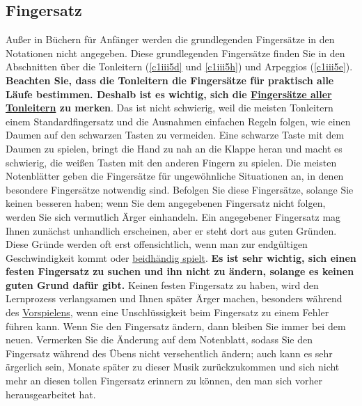 
\subsection{Fingersatz}
\label{c1ii18}

Außer in Büchern für Anfänger werden die grundlegenden Fingersätze in den Notationen nicht angegeben.
Diese grundlegenden Fingersätze finden Sie in den Abschnitten über die Tonleitern (\hyperref[c1iii5d]{\autoref{c1iii5d}} und \hyperref[c1iii5h]{\autoref{c1iii5h}}) und Arpeggios (\hyperref[c1iii5e]{\autoref{c1iii5e}}).
\textbf{Beachten Sie, dass die Tonleitern die Fingersätze für praktisch alle Läufe bestimmen.
Deshalb ist es wichtig, sich die \hyperref[table]{Fingersätze aller Tonleitern} zu merken}.
Das ist nicht schwierig, weil die meisten Tonleitern einem Standardfingersatz und die Ausnahmen einfachen Regeln folgen, wie einen Daumen auf den schwarzen Tasten zu vermeiden.
Eine schwarze Taste mit dem Daumen zu spielen, bringt die Hand zu nah an die Klappe heran und macht es schwierig, die weißen Tasten mit den anderen Fingern zu spielen.
Die meisten Notenblätter geben die Fingersätze für ungewöhnliche Situationen an, in denen besondere Fingersätze notwendig sind.
Befolgen Sie diese Fingersätze, solange Sie keinen besseren haben; wenn Sie dem angegebenen Fingersatz nicht folgen, werden Sie sich vermutlich Ärger einhandeln.
Ein angegebener Fingersatz mag Ihnen zunächst unhandlich erscheinen, aber er steht dort aus guten Gründen.
Diese Gründe werden oft erst offensichtlich, wenn man zur endgültigen Geschwindigkeit kommt oder \hyperref[c1ii25]{beidhändig spielt}.
\textbf{Es ist sehr wichtig, sich einen festen Fingersatz zu suchen und ihn nicht zu ändern, solange es keinen guten Grund dafür gibt.}
Keinen festen Fingersatz zu haben, wird den Lernprozess verlangsamen und Ihnen später Ärger machen, besonders während des \hyperref[c1iii14]{Vorspielens}, wenn eine Unschlüssigkeit beim Fingersatz zu einem Fehler führen kann.
Wenn Sie den Fingersatz ändern, dann bleiben Sie immer bei dem neuen.
Vermerken Sie die Änderung auf dem Notenblatt, sodass Sie den Fingersatz während des Übens nicht versehentlich ändern; auch kann es sehr ärgerlich sein, Monate später zu dieser Musik zurückzukommen und sich nicht mehr an diesen tollen Fingersatz erinnern zu können, den man sich vorher herausgearbeitet hat.

